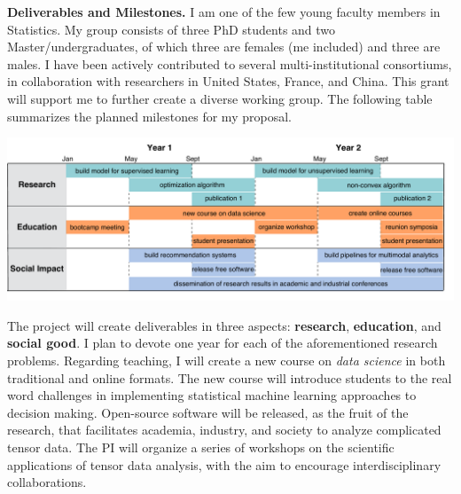 \documentclass[10pt]{article}
\theoremstyle{plain}
\theoremstyle{definition}
\begin{document}
{\bf Deliverables and Milestones.}
I am one of the few young faculty members in Statistics. My group consists of three PhD students and two Master/undergraduates, of which three are females (me included) and three are males. I have been actively contributed to several multi-institutional consortiums, in collaboration with researchers in United States, France, and China. This grant will support me to further create a diverse working group. The following table summarizes the planned milestones for my proposal. 
\vspace{-.4cm}
\begin{center}
\includegraphics[width=.98\textwidth]{milestone.pdf}
\end{center}
\vspace{-.4cm}
The project will create deliverables in three aspects: {\bf research}, {\bf education}, and {\bf social good}. I plan to devote one year for each of the aforementioned research problems. Regarding teaching, I will create a new course on \emph{data science} in both traditional and online formats. The new course will introduce students to the real word challenges in implementing statistical machine learning approaches to decision making. Open-source software will be released, as the fruit of the research, that facilitates academia, industry, and society to analyze complicated tensor data. The PI will organize a series of workshops on the scientific applications of tensor data analysis, with the aim to encourage interdisciplinary collaborations. 
\end{document}
